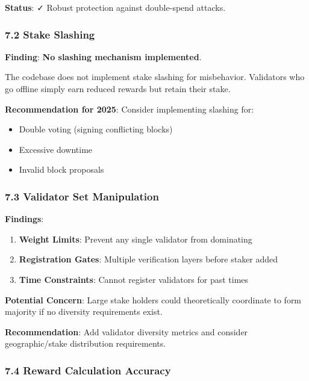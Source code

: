\documentclass[
]{article}
\providecommand{\tightlist}{%
  \setlength{\itemsep}{0pt}\setlength{\parskip}{0pt}}
\begin{document}
\textbf{Status}: ✓ Robust protection against double-spend attacks.

\subsubsection{7.2 Stake Slashing}\label{72-stake-slashing}

\textbf{Finding}: \textbf{No slashing mechanism implemented}.

The codebase does not implement stake slashing for misbehavior.
Validators who go offline simply earn reduced rewards but retain their
stake.

\textbf{Recommendation for 2025}: Consider implementing slashing for:

\begin{itemize}
\tightlist
\item
  Double voting (signing conflicting blocks)
\item
  Excessive downtime
\item
  Invalid block proposals
\end{itemize}

\subsubsection{7.3 Validator Set
Manipulation}\label{73-validator-set-manipulation}

\textbf{Findings}:

\begin{enumerate}
\def\labelenumi{\arabic{enumi}.}
\tightlist
\item
  \textbf{Weight Limits}: Prevent any single validator from dominating
\item
  \textbf{Registration Gates}: Multiple verification layers before
  staker added
\item
  \textbf{Time Constraints}: Cannot register validators for past times
\end{enumerate}

\textbf{Potential Concern}: Large stake holders could theoretically
coordinate to form majority if no diversity requirements exist.

\textbf{Recommendation}: Add validator diversity metrics and consider
geographic/stake distribution requirements.

\subsubsection{7.4 Reward Calculation
Accuracy}\label{74-reward-calculation-accuracy}
\end{document}
